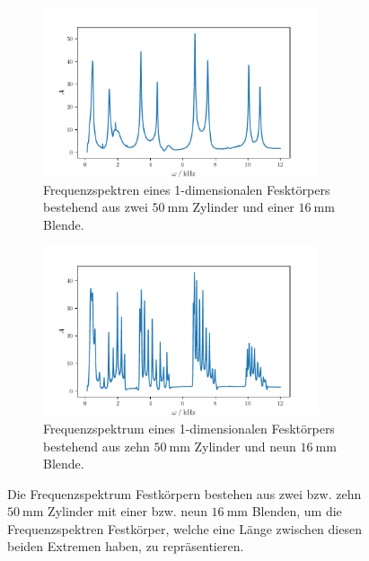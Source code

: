 \begin{figure}
    \begin{subfigure}{0.48\textwidth}%
    \centering%
    \includegraphics[height=5cm]{build/2c1b16.pdf}%
    \caption{Frequenzspektren eines 1-dimensionalen Fesktörpers bestehend aus zwei $\qty{50}{\milli\meter}$ Zylinder und einer $\qty{16}{\milli\meter}$ Blende.}%
    \label{fig:2c1b16}%
    \end{subfigure}%
    \hfill%
    \begin{subfigure}{0.48\textwidth}%
    \centering%
    \includegraphics[height=5cm]{build/10c9b16.pdf}%
    \caption{Frequenzspektrum eines 1-dimensionalen Fesktörpers bestehend aus zehn $\qty{50}{\milli\meter}$ Zylinder und neun $\qty{16}{\milli\meter}$ Blende.}%
    \label{fig:2c1b16}%
    \end{subfigure}%
    \caption{Die Frequenzspektrum Festkörpern bestehen aus zwei bzw. zehn $\qty{50}{\milli\meter}$ Zylinder mit einer bzw. neun $\qty{16}{\milli\meter}$ Blenden, um die 
    Frequenzspektren Festkörper, welche eine Länge zwischen diesen beiden Extremen haben, zu repräsentieren.}%
    \label{fig:16mm}
\end{figure}%
